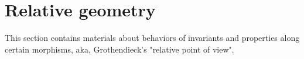 \documentclass[../main.tex]{subfiles}
\begin{document}
\section{Relative geometry}\label{sec:Relative geometry}
This section contains materials about behaviors of invariants and properties along certain morphisms, aka, Grothendieck's "relative point of view".
\end{document}
